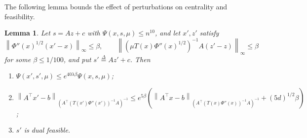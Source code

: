 \documentclass[11pt]{article}
\newtheorem{lemma}{Lemma}[section]
\newcommand{\defeq}{\stackrel{\Delta}{=}}
\begin{document}
The following lemma bounds the effect of perturbations on centrality and
feasibility.

\begin{lemma}
\label{lem:perturb}
Let $s = A z + c$ with
$\Psi(x, s, \mu) \le n^{10}$, and let
$x', z'$ satisfy
\[
\left\| \Phi''(x)^{1/2} (x' - x) \right\|_{\infty} \le \beta,
\qquad
\left\| \left( \mu T(x) \Phi''(x)^{1/2} \right)^{-1}
A (z' - z) \right\|_{\infty} \le \beta
\]
for some $\beta \le 1/100$, and put
$s' \defeq A z' + c$.
Then
\begin{enumerate}
\item \label{itm:perturb:1}
  $\Psi(x', s', \mu) \le e^{40 \lambda \beta} \Psi(x, s, \mu)$;
\item \label{itm:perturb:2}
  $\displaystyle \left\| A^\top x' - b \right\|_{(A^\top (T(x') \Phi''(x'))^{-1} A)^{-1}} \le e^{5 \beta} \left( \left\| A^\top x - b \right\|_{(A^\top (T(x) \Phi''(x))^{-1} A)^{-1}} + (5 d)^{1/2} \beta \right)$;
\item \label{itm:perturb:3} $s'$ is dual feasible.
\end{enumerate}
\end{lemma}
\end{document}
